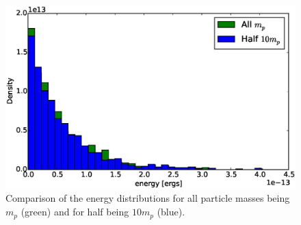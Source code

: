 \documentclass[12pt]{amsart}
\begin{document}
\begin{figure}[h!]
  \centering
    \includegraphics[width=1.0\textwidth]{energy_comp.eps}
    \caption{Comparison of the energy distributions for all particle masses being $m_p$ (green) and for half being $10m_p$ (blue).}
\end{figure}
\end{document}
